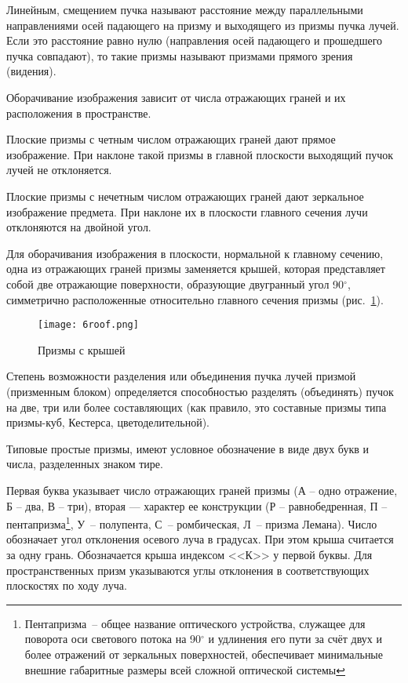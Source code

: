 Линейным, смещением пучка называют расстояние между параллельными направлениями осей падающего на призму и выходящего из призмы пучка лучей. Если это расстояние равно нулю (направления осей падающего и прошедшего пучка совпадают), то такие призмы называют призмами прямого зрения (видения).

Оборачивание изображения зависит от числа отражающих граней и их расположения в пространстве.

Плоские призмы с четным числом отражающих граней дают прямое изображение. При наклоне такой призмы в главной плоскости выходящий пучок лучей не отклоняется.

Плоские призмы с нечетным числом отражающих граней дают зеркальное изображение предмета. При наклоне их в плоскости главного сечения лучи отклоняются на двойной угол.

Для оборачивания изображения в плоскости, нормальной к главному сечению, одна из отражающих граней призмы заменяется крышей, которая представляет собой две отражающие поверхности, образующие двугранный угол 90$ ^\circ $, симметрично расположенные относительно главного сечения призмы (рис.~\ref{pic:6roof}).

\begin{figure}[h!]
	\caption{ Призмы с крышей }
	\texttt{[image: 6roof.png]}
	\label{pic:6roof}
\end{figure}

Степень возможности разделения или объединения пучка лучей призмой (призменным блоком) определяется способностью разделять (объединять) пучок на две, три или более составляющих (как правило, это составные призмы типа призмы-куб, Кестерса, цветоделительной).

Типовые простые призмы, имеют условное обозначение в виде двух букв и числа, разделенных знаком тире.

Первая буква указывает число отражающих граней призмы (А -- одно отражение, Б -- два, В -- три), вторая --- характер ее конструкции (Р --  равнобедренная, П -- пентапризма\footnote{Пентапризма~-- общее название оптического устройства, служащее для поворота оси светового потока на 90$^\circ$ и удлинения его пути за счёт двух и более отражений от зеркальных поверхностей, обеспечивает минимальные внешние габаритные размеры всей сложной оптической системы}, У~-- полупента, С~-- ромбическая, Л~-- призма Лемана). Число обозначает угол отклонения осевого луча в градусах. При этом крыша считается за одну грань. Обозначается крыша индексом <<К>> у первой буквы. Для пространственных призм указываются углы отклонения в соответствующих плоскостях по ходу луча.

